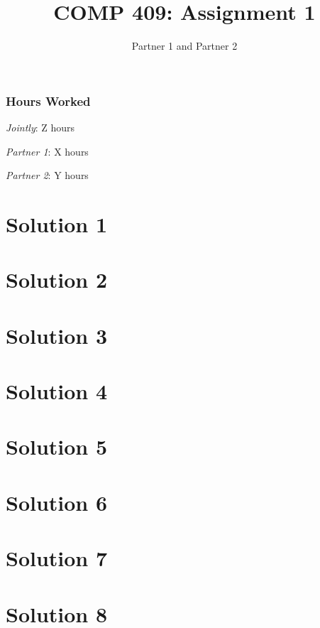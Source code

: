 \documentclass[12pt]{article}
\title{COMP 409: Assignment 1}
\author{Partner 1 and Partner 2}
\begin{document}
\maketitle


\subsubsection*{Hours Worked} 

\noindent\emph{Jointly}: Z hours

\noindent\emph{Partner 1}: X hours

\noindent\emph{Partner 2}: Y hours


\section*{Solution 1}


\section*{Solution 2}


\section*{Solution 3}


\section*{Solution 4}


\section*{Solution 5}


\section*{Solution 6}


\section*{Solution 7}


\section*{Solution 8}
\end{document}
